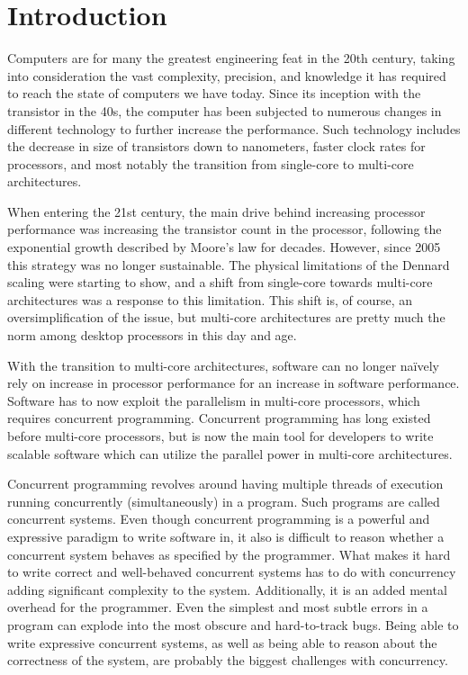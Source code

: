 
\chapter{Introduction}
\label{ch:introduction}

Computers are for many the greatest engineering feat in the 20th century, taking into consideration the vast complexity, precision, and knowledge it has required to reach the state of computers we have today. Since its inception with the transistor in the 40s, the computer has been subjected to numerous changes in different technology to further increase the performance. Such technology includes the decrease in size of transistors down to nanometers, faster clock rates for processors, and most notably the transition from single\hyp{}core to multi\hyp{}core architectures.

When entering the 21st century, the main drive behind increasing processor performance was increasing the transistor count in the processor, following the exponential growth described by Moore's law for decades. However, since 2005 this strategy was no longer sustainable. The physical limitations of the Dennard scaling were starting to show, and a shift from single\hyp{}core towards multi\hyp{}core architectures was a response to this limitation. This shift is, of course, an oversimplification of the issue, but multi\hyp{}core architectures are pretty much the norm among desktop processors in this day and age.

With the transition to multi\hyp{}core architectures, software can no longer naïvely rely on increase in processor performance for an increase in software performance. Software has to now exploit the parallelism in multi\hyp{}core processors, which requires concurrent programming. Concurrent programming has long existed before multi\hyp{}core processors, but is now the main tool for developers to write scalable software which can utilize the parallel power in multi\hyp{}core architectures.

Concurrent programming revolves around having multiple threads of execution running concurrently (simultaneously) in a program. Such programs are called concurrent systems. Even though concurrent programming is a powerful and expressive paradigm to write software in, it also is difficult to reason whether a concurrent system behaves as specified by the programmer. What makes it hard to write correct and well\hyp{}behaved concurrent systems has to do with concurrency adding significant complexity to the system. Additionally, it is an added mental overhead for the programmer. Even the simplest and most subtle errors in a program can explode into the most obscure and hard\hyp{}to\hyp{}track bugs. Being able to write expressive concurrent systems, as well as being able to reason about the correctness of the system, are probably the biggest challenges with concurrency.

